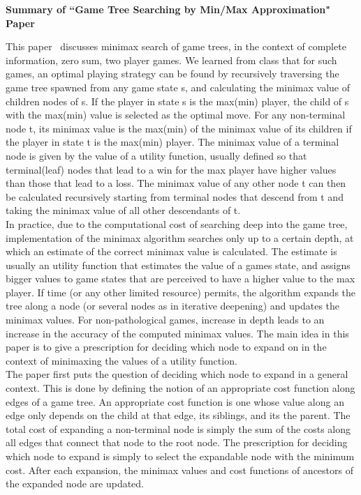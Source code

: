 \documentclass[11pt]{article}
\begin{document}
\begin{center}
{\bf Summary of ``Game Tree Searching by Min/Max Approximation" Paper }
\end{center}

This paper~\cite{Paper} discusses minimax search of game trees, in the context of complete information, zero sum, two player games. We learned from class that for such games, an optimal playing strategy can be found by recursively traversing the game tree spawned from any game state s, and calculating the minimax value of children nodes of s. If the player in state s is the max(min) player, the child of s with the max(min) value is selected as the optimal move. For any non-terminal node t, its minimax value is the max(min) of the minimax value of its children if the player in state t is the max(min) player.  The minimax value of a terminal node is given by the value of a utility function, usually defined so that terminal(leaf) nodes that lead to a win for the max player have higher values than those that lead to a loss. The minimax value of any other node t can then be calculated recursively starting from terminal nodes that descend from t and taking the minimax value of all other descendants of t. \\
 
In practice, due to the computational cost of searching deep into the game tree, implementation of the minimax algorithm searches only up to a certain depth, at which an estimate of the correct minimax value is calculated. The estimate is usually an utility function that estimates the value of a games state, and assigns bigger values to game states that are perceived to have a higher value to the max player. If time (or any other limited resource) permits, the algorithm expands the tree along a node (or several nodes as in iterative deepening) and updates the minimax values. For non-pathological games, increase in depth leads to an increase in the accuracy of the computed minimax values. The main idea in this paper is to give a prescription for deciding which node to expand on in the context of minimaxing the values of a utility function.\\
 
The paper first puts the question of deciding which node to expand in a general context. This is done by defining the notion of an appropriate cost function along edges of a game tree. An appropriate cost function is one whose value along an edge only depends on the child at that edge, its siblings, and its the parent. The total cost of expanding a non-terminal node is simply the sum of the costs along all edges that connect that node to the root node. The prescription for deciding which node to expand is simply to select the expandable node with the minimum cost. After each expansion, the minimax values and cost functions of ancestors of the expanded node are updated.\\
 
\end{document}
